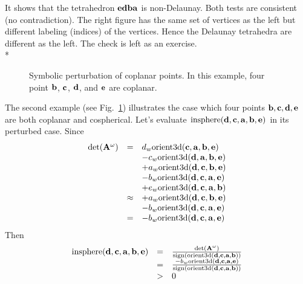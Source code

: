 It shows that the tetrahedron ${\bf edba}$ is non-Delaunay. Both tests are consistent (no contradiction).  The right figure has the same set of vertices as the left but different labeling (indices) of the vertices. Hence the Delaunay tetrahedra are different as the left. The check is left as an exercise.\\*

\begin{figure}
\caption{Symbolic perturbation of coplanar points. In this example, four point ${\bf b}$, ${\bf c}$, ${\bf d}$, and ${\bf e}$ are coplanar.}
\label{fig:ex2}
\end{figure}

The second example (see Fig.~\ref{fig:ex2}) illustrates the case which four points ${\bf b}, {\bf c}, {\bf d}, {\bf e}$ are both coplanar and cospherical. Let's evaluate $\textrm{insphere}({\bf d},{\bf c},{\bf a},{\bf b},{\bf e})$ in its perturbed case. Since
\[
\begin{array}{rcl}
\textrm{det}({\bf A}^{\omega}) &=&
d_w\textrm{orient3d}({\bf c},{\bf a},{\bf b},{\bf e})\\
& & -c_w\textrm{orient3d}({\bf d},{\bf a},{\bf b},{\bf e})\\
& & +a_w\textrm{orient3d}({\bf d},{\bf c},{\bf b},{\bf e})\\
& & -b_w\textrm{orient3d}({\bf d},{\bf c},{\bf a},{\bf e})\\
& & +e_w\textrm{orient3d}({\bf d},{\bf c},{\bf a},{\bf b})\\
&\approx& +a_w\textrm{orient3d}({\bf d},{\bf c},{\bf b},{\bf e})\\
& & -b_w\textrm{orient3d}({\bf d},{\bf c},{\bf a},{\bf e})\\
&=& -b_w\textrm{orient3d}({\bf d},{\bf c},{\bf a},{\bf e})
\end{array}
\]
Then
\[
\begin{array}{rcl}
\textrm{insphere}({\bf d},{\bf c},{\bf a},{\bf b},{\bf e}) &=&
\frac{\textrm{det}({\bf A}^{\omega})}{\textrm{sign}\left(\textrm{orient3d}({\bf d},{\bf c},{\bf a},{\bf b})\right)}\\
&=& \frac{-b_w\textrm{orient3d}({\bf d},{\bf c},{\bf a},{\bf e})}{\textrm{sign}\left(\textrm{orient3d}({\bf d},{\bf c},{\bf a},{\bf b})\right)}\\
&>& 0
\end{array}
\]

